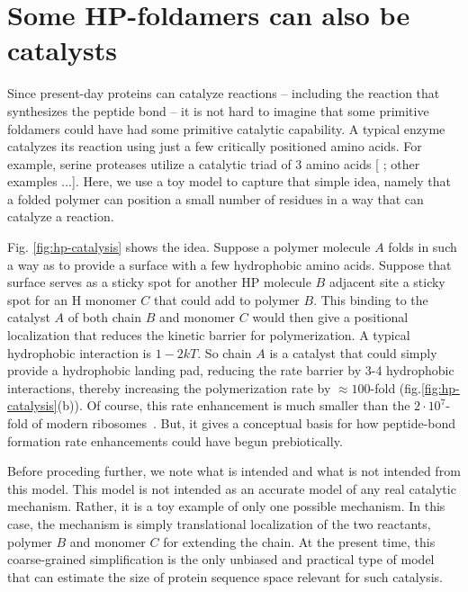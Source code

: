 \documentclass[journal=jacsat,manuscript=article,layout=twocolumn]{achemso}
\begin{document}
\section{Some HP-foldamers can also be catalysts}

Since present-day proteins can catalyze reactions -- including the reaction that synthesizes the 
peptide bond -- it is not hard to imagine that some primitive foldamers could have had some 
primitive catalytic capability.  A typical enzyme catalyzes its reaction using just a few critically 
positioned amino acids.  For example, serine proteases utilize a catalytic triad of 3 amino acids [ 
; other examples ...].  Here, we use a toy model to capture that simple idea, namely that a folded 
polymer can position a small number of residues in a way that can catalyze a reaction.  

Fig. \ref{fig:hp-catalysis} shows the idea.  Suppose a polymer molecule $A$ folds in such a way as 
to provide a surface with a few hydrophobic amino acids.  Suppose that surface serves as a sticky 
spot for another HP molecule $B$ adjacent site a sticky spot for an H monomer $C$ that could add to 
polymer $B$.  This binding to the catalyst $A$ of both chain $B$ and monomer $C$ would then give a 
positional localization that reduces the kinetic barrier for polymerization.  A typical hydrophobic 
interaction is $1-2kT$.  So chain $A$ is a catalyst that could simply provide a hydrophobic landing 
pad, reducing the rate barrier by 3-4 hydrophobic interactions, thereby increasing the 
polymerization rate by $\approx 100$-fold (fig.\ref{fig:hp-catalysis}(b)).  Of course, this rate 
enhancement is much smaller than the $2\cdot10^7$-fold of modern ribosomes~\cite{Sievers2004a}. But, 
it gives a conceptual basis for how peptide-bond formation rate enhancements could have begun 
prebiotically.

Before proceding further, we note what is intended and what is not intended from this model.  This 
model is not intended as an accurate model of any real catalytic mechanism.  Rather, it is a toy 
example of only one possible mechanism.  In this case, the mechanism is simply translational 
localization of the two reactants, polymer $B$ and monomer $C$ for extending the chain.  At the 
present time, this coarse-grained simplification is the only unbiased and practical type of model 
that can estimate the size of protein sequence space relevant for such catalysis.
\end{document}
